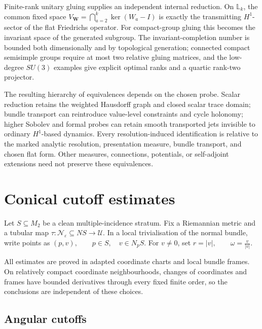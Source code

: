 \documentclass[11pt]{article}
\theoremstyle{plain}
\theoremstyle{definition}
\begin{document}
Finite-rank unitary gluing supplies an independent internal reduction. On \(\mathbb L_k\), the common fixed space \(V_{\mathbf W}=\bigcap_{a=2}^k\ker(W_a-I)\) is exactly the transmitting \(H^1\)-sector of the flat Friedrichs operator. For compact-group gluing this becomes the invariant space of the generated subgroup. The invariant-completion number is bounded both dimensionally and by topological generation; connected compact semisimple groups require at most two relative gluing matrices, and the low-degree \(SU(3)\) examples give explicit optimal ranks and a quartic rank-two projector.

The resulting hierarchy of equivalences depends on the chosen probe. Scalar reduction retains the weighted Hausdorff graph and closed scalar trace domain; bundle transport can reintroduce value-level constraints and cycle holonomy; higher Sobolev and formal probes can retain smooth transported jets invisible to ordinary \(H^1\)-based dynamics. Every resolution-induced identification is relative to the marked analytic resolution, presentation measure, bundle transport, and chosen flat form. Other measures, connections, potentials, or self-adjoint extensions need not preserve these equivalences.
\appendix
\section{Conical cutoff estimates}
\label{app:conical-cutoffs}



Let \(S\subseteq M_2\) be a clean multiple-incidence stratum. Fix a Riemannian metric and a
tubular map
\(\tau: \mathcal N_\varepsilon \subseteq NS \longrightarrow \mathcal U\).
In a local trivialisation of the normal bundle, write points as
\((p,v), \qquad p\in S, \quad v\in N_pS\).
For \(v\neq0\), set
\(r=|v|, \qquad \omega=\frac{v}{|v|}\).

All estimates are proved in adapted coordinate charts and local bundle
frames. On relatively compact coordinate neighbourhoods, changes of
coordinates and frames have bounded derivatives through every fixed
finite order, so the conclusions are independent of these choices.

\subsection{Angular cutoffs}
\label{appsubsec:angular-cutoffs}
\end{document}
